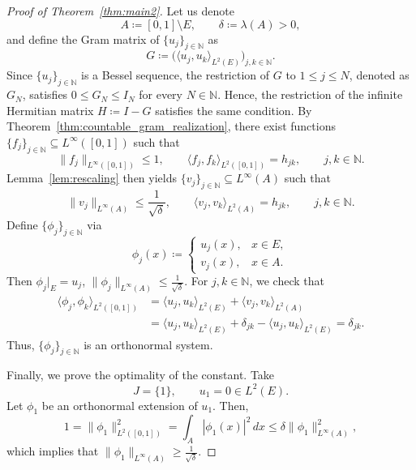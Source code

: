 \documentclass[reqno,a4paper,12pt]{amsart}
\numberwithin{equation}{section}
\def\N{{\mathbb N}}
\newcommand\1{\mathds{1}}
\begin{document}
\begin{proof}[Proof of Theorem~\ref{thm:main2}]
    Let us denote
    \begin{equation*}
        A\coloneqq[0,1]\setminus E,
        \qquad
        \delta\coloneqq\lambda(A)>0,
    \end{equation*}
    and define the Gram matrix of $\{u_j\}_{j\in\N}$ as 
    \begin{equation*}
    G
    \coloneqq
    \bigl(
    \langle u_j,u_k\rangle_{L^2(E)}
    \bigr)_{j,k\in \N}.
    \end{equation*}
    Since $\{u_j\}_{j\in\N}$ is a Bessel sequence, the restriction of $G$ to $1\leq j\leq N$, denoted as $G_N$, satisfies $0\leq G_N\leq I_N$ for every $N\in \N$. Hence, the restriction of the infinite Hermitian matrix $H\coloneqq I-G$ satisfies the same condition. By Theorem~\ref{thm:countable_gram_realization}, there exist functions $\{f_j\}_{j\in\N}\subseteq L^\infty([0,1])$ such that
    \begin{equation*}
        \|f_j\|_{L^\infty([0,1])}\le1,
        \qquad
        \langle f_j, f_k\rangle_{L^2([0,1])}
        =
        h_{jk},
        \qquad j,k\in \N.
    \end{equation*}
    Lemma~\ref{lem:rescaling} then yields $\{v_j\}_{j\in\N}\subseteq L^\infty(A)$ such that
    \begin{equation*}
        \|v_j\|_{L^\infty(A)}\le \frac{1}{\sqrt{\delta}},
        \qquad
        \langle v_j, v_k\rangle_{L^2(A)}
        =
        h_{jk},
        \qquad j,k\in \N.
    \end{equation*} 
    Define $\{\phi_j\}_{j\in\N}$ via
    \begin{equation*}
    \phi_j(x)
    \coloneqq
    \begin{cases}
    u_j(x),&x\in E,\\
    v_j(x),&x\in A.
    \end{cases}
    \end{equation*}
    Then $\phi_j|_E=u_j$, $\|\phi_j\|_{L^\infty(A)} \le \frac{1}{\sqrt{\delta}}$. For $j,k\in\N$, we check that
    \begin{align*}
    \langle\phi_j,\phi_k\rangle_{L^2([0,1])}
    &=
    \langle u_j,u_k\rangle_{L^2(E)}
    +
    \langle v_j,v_k\rangle_{L^2(A)} \\
    &=
    \langle u_j,u_k\rangle_{L^2(E)}
    +
    \delta_{jk}
    -
    \langle u_j,u_k\rangle_{L^2(E)}
    =
    \delta_{jk}.
    \end{align*}
    Thus, $\{\phi_j\}_{j\in \N}$ is an orthonormal system.
    
    Finally, we prove the optimality of the constant. Take
    \begin{equation*}
    J=\{1\},
    \qquad
    u_1=0\in L^2(E).
    \end{equation*}
    Let $\phi_1$ be an orthonormal extension of $u_1$. Then,
    \begin{equation*}
    1
    =
    \|\phi_1\|_{L^2([0,1])}^2
    =
    \int_A|\phi_1(x)|^2\,dx
    \le
    \delta\|\phi_1\|_{L^\infty(A)}^2,
    \end{equation*}
    which implies that $\|\phi_1\|_{L^\infty(A)} \ge \frac{1}{\sqrt{\delta}}$.
\end{proof}
\end{document}
